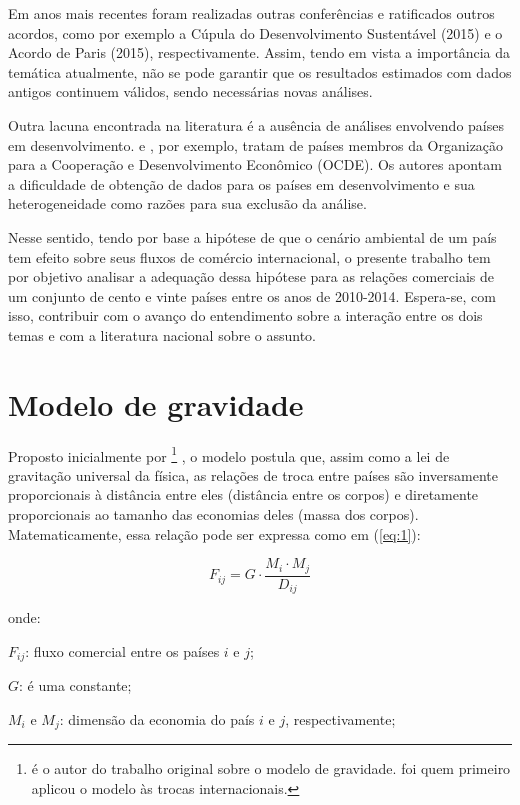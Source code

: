 Em anos mais recentes foram realizadas outras conferências e ratificados outros acordos, como por exemplo a Cúpula do Desenvolvimento Sustentável (2015) e o Acordo de Paris (2015), respectivamente. Assim, tendo em vista a importância da temática atualmente, não se pode garantir que os resultados estimados com dados antigos continuem válidos, sendo necessárias novas análises.

Outra lacuna encontrada na literatura é a ausência de análises envolvendo países em desenvolvimento.  e , por exemplo, tratam de países membros da Organização para a Cooperação e Desenvolvimento Econômico (OCDE). Os autores apontam a dificuldade de obtenção de dados para os países em desenvolvimento e sua heterogeneidade como razões para sua exclusão da análise.

Nesse sentido, tendo por base a hipótese de que o cenário ambiental de um país tem efeito sobre seus fluxos de comércio internacional, o presente trabalho tem por objetivo analisar a adequação dessa hipótese para as relações comerciais de um conjunto de cento e vinte países entre os anos de 2010-2014. Espera-se, com isso, contribuir com o avanço do entendimento sobre a interação entre os dois temas e com a literatura nacional sobre o assunto.

\section{Modelo de gravidade}
 Proposto inicialmente por  \footnote{ é o autor do trabalho original sobre o modelo de gravidade.  foi quem primeiro aplicou o modelo às trocas internacionais.} , o modelo postula que, assim como a lei de gravitação universal da física, as relações de troca entre países são inversamente proporcionais à distância entre eles (distância entre os corpos) e diretamente proporcionais ao tamanho das economias deles (massa dos corpos). Matematicamente, essa relação pode ser expressa como em (\ref{eq:1}):
 
 \begin{equation} \label{eq:1} F_{ij} = G \cdot \frac{M_i \cdot M_j}{D_{ij}} \end{equation}
 
onde:

 $F_{ij}$: fluxo comercial entre os países $i$ e $j$;
 
 $G$: é uma constante;
 
 $M_i$ e $M_j$: dimensão da economia do país $i$ e $j$, respectivamente;
 
